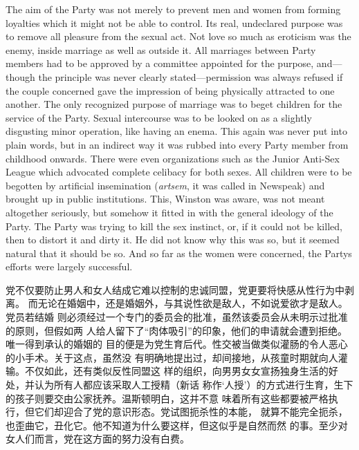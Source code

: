 \begin{paracol}{2}
\switchcolumn*

The aim of the Party was not merely to prevent men and women from
forming loyalties which it might not be able to control. Its real,
undeclared purpose was to remove all pleasure from the sexual act. Not
love so much as eroticism was the enemy, inside marriage as well as
outside it. All marriages between Party members had to be approved by a
committee appointed for the purpose, and---though the principle was
never clearly stated---permission was always refused if the couple
concerned gave the impression of being physically attracted to one
another. The only recognized purpose of marriage was to beget children
for the service of the Party. Sexual intercourse was to be looked on as
a slightly disgusting minor operation, like having an enema. This again
was never put into plain words, but in an indirect way it was rubbed
into every Party member from childhood onwards. There were even
organizations such as the Junior Anti-Sex League which advocated
complete celibacy for both sexes. All children were to be begotten by
artificial insemination (\emph{artsem}, it was called in Newspeak) and
brought up in public institutions. This, Winston was aware, was not
meant altogether seriously, but somehow it fitted in with the general
ideology of the Party. The Party was trying to kill the sex instinct,
or, if it could not be killed, then to distort it and dirty it. He did
not know why this was so, but it seemed natural that it should be so.
And so far as the women were concerned, the Party\textquotesingle s
efforts were largely successful.

\switchcolumn

党不仅要防止男人和女人结成它难以控制的忠诚同盟，党更要将快感从性行为中剥离。
而无论在婚姻中，还是婚姻外，与其说性欲是敌人，不如说爱欲才是敌人。党员若结婚
则必须经过一个专门的委员会的批准，虽然该委员会从未明示过批准的原则，但假如两
人给人留下了``肉体吸引''的印象，他们的申请就会遭到拒绝。唯一得到承认的婚姻的
目的便是为党生育后代。性交被当做类似灌肠的令人恶心的小手术。关于这点，虽然没
有明确地提出过，却间接地，从孩童时期就向人灌输。不仅如此，还有类似反性同盟这
样的组织，向男男女女宣扬独身生活的好处，并认为所有人都应该采取人工授精（新话
称作`人授'）的方式进行生育，生下的孩子则要交由公家抚养。温斯顿明白，这并不意
味着所有这些都要被严格执行，但它们却迎合了党的意识形态。党试图扼杀性的本能，
就算不能完全扼杀，也歪曲它，丑化它。他不知道为什么要这样，但这似乎是自然而然
的事。至少对女人们而言，党在这方面的努力没有白费。

\switchcolumn*


\end{paracol}
